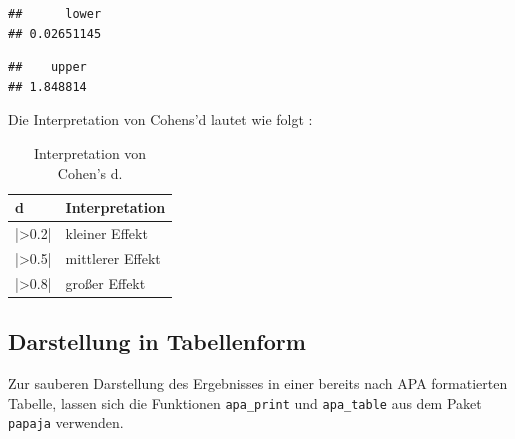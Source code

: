 \documentclass[
]{book}
\newenvironment{Shaded}{\begin{snugshade}}{\end{snugshade}}
\newcommand{\AttributeTok}[1]{\textcolor[rgb]{0.77,0.63,0.00}{#1}}
\newcommand{\ConstantTok}[1]{\textcolor[rgb]{0.00,0.00,0.00}{#1}}
\newcommand{\DecValTok}[1]{\textcolor[rgb]{0.00,0.00,0.81}{#1}}
\newcommand{\FunctionTok}[1]{\textcolor[rgb]{0.00,0.00,0.00}{#1}}
\newcommand{\NormalTok}[1]{#1}
\newcommand{\SpecialCharTok}[1]{\textcolor[rgb]{0.00,0.00,0.00}{#1}}
\begin{document}
\begin{verbatim}
##      lower 
## 0.02651145
\end{verbatim}

\begin{Shaded}
\end{Shaded}

\begin{verbatim}
##    upper 
## 1.848814
\end{verbatim}

Die Interpretation von Cohens'd lautet wie folgt \citet{cohen1992quantitative}:

\begin{table}[tbp]

\begin{center}
\begin{threeparttable}

\caption{\label{tab:unnamed-chunk-227}Interpretation von Cohen's d.}

\begin{tabular}{ll}
\toprule
d & \multicolumn{1}{c}{Interpretation}\\
\midrule
|>0.2| & kleiner Effekt\\
|>0.5| & mittlerer Effekt\\
|>0.8| & großer Effekt\\
\bottomrule
\end{tabular}

\end{threeparttable}
\end{center}

\end{table}

\hypertarget{darstellung-in-tabellenform}{%
\subsection{Darstellung in Tabellenform}\label{darstellung-in-tabellenform}}

Zur sauberen Darstellung des Ergebnisses in einer bereits nach APA formatierten Tabelle, lassen sich die Funktionen \texttt{apa\_print} und \texttt{apa\_table} aus dem Paket \texttt{papaja} verwenden.
\end{document}
